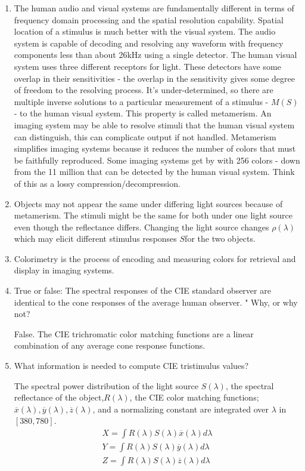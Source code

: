 \begin{enumerate}
 \item
 The human audio and visual systems are fundamentally different in terms of frequency domain processing and the spatial resolution capability. Spatial location of a stimulus is much better with the visual system.  The audio system is capable of decoding and resolving any waveform with frequency components less than about 26kHz using a single detector.  The human visual system uses three different receptors for light. These detectors have some overlap in their sensitivities - the overlap in the sensitivity gives some degree of freedom to the resolving process. It's under-determined, so there are multiple inverse solutions to a particular measurement of a stimulus - $M(S)$ - to the human visual system. This property is called metamerism.  An imaging system may be able to resolve stimuli that the human visual system can distinguish, this can complicate output if not handled. Metamerism simplifies imaging systems because it reduces the number of colors that must be faithfully reproduced.  Some imaging systems get by with 256 colors - down from the 11 million that can be detected by the human visual system.  Think of this as a lossy compression/decompression.
 \item
 Objects may not appear the same under differing light sources because of metamerism.  The stimuli might be the same for both under one light source even though the reflectance differs. Changing the light source changes $\rho(\lambda)$ which may elicit different stimulus responses $S$for the two objects.
 \item
 Colorimetry is the process of encoding and measuring colors for retrieval and display in imaging systems.
 \item
  True or false: The spectral responses of the CIE standard observer are identical to the cone responses of the average human observer. "   Why, or why not?
 \par  False.  The CIE trichromatic color matching functions are a linear combination of any average cone response functions.
 \item
 What information is needed to compute CIE tristimulus values?
 \par The spectral power distribution of the light source \(S(\lambda)\), the spectral reflectance of the object,\(R(\lambda)\), the CIE color matching functions; \begin{math}\overline{x}(\lambda),\overline{y}(\lambda),\overline{z}(\lambda) \end{math}, and a normalizing constant are integrated over \( \lambda \) in \( [380,780] \). \begin{eqnarray} \nonumber X = \int R(\lambda) S(\lambda) \overline{x}(\lambda) d\lambda \\ \nonumber Y = \int R(\lambda) S(\lambda) \overline{y}(\lambda) d\lambda \\ \nonumber Z = \int R(\lambda) S(\lambda) \overline{z}(\lambda) d\lambda \end{eqnarray}

\end{enumerate}
